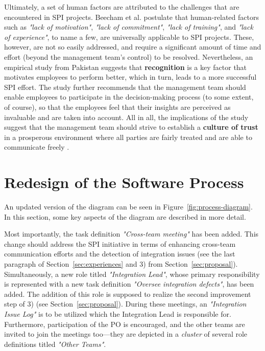 \documentclass[conference]{IEEEtran}
\begin{document}
Ultimately, a set of human factors are attributed to the challenges that are
encountered in SPI projects. Beecham et al. \cite{Beecham2003}
postulate that human-related factors such as \textit{"lack of motivation"},
\textit{"lack of commitment"}, \textit{"lack of training"}, and \textit{"lack
of experience"}, to name a few, are universally applicable to SPI projects.
These, however, are not so easily addressed, and require a significant amount
of time and effort (beyond the management team's control) to be resolved.
Nevertheless, an empirical study from Pakistan \cite{Danish2010} suggests that
\textbf{recognition} is a key factor that motivates employees to perform better,
which in turn, leads to a more successful SPI effort. The study further
recommends that the management team should enable employees to participate in
the decision-making process (to some extent, of course), so that the employees
feel that their insights are perceived as invaluable and are taken into
account. All in all, the implications of the study suggest that the management
team should strive to establish a \textbf{culture of trust} in a prosperous
environment where all parties are fairly treated and are able to communicate
freely \cite{Danish2010}.

\section{Redesign of the Software Process}
\label{sec:redesign}

An updated version of the diagram can be seen in
Figure~\ref{fig:process-diagram}. In this section, some key aspects of the
diagram are described in more detail.

Most importantly, the task definition \textit{"Cross-team meeting"} has been
added. This change should address the SPI initiative in terms of enhancing
cross-team communication efforts and the detection of integration issues (see
the last paragraph of Section~\ref{sec:experiences} and 3) from
Section~\ref{sec:proposal}). Simultaneously, a new role titled
\textit{"Integration Lead"}, whose primary responsibility is represented with a
new task definition \textit{"Oversee integration defects"}, has been added. The
addition of this role is supposed to realize the second improvement step of 3)
(see Section~\ref{sec:proposal}). During these meetings, an
\textit{"Integration Issue Log"} is to be utilized which the Integration Lead
is responsible for. Furthermore, participation of the PO is encouraged, and the
other teams are invited to join the meetings too---they are depicted in a
\textit{cluster} of several role definitions titled \textit{"Other Teams"}.
\end{document}

